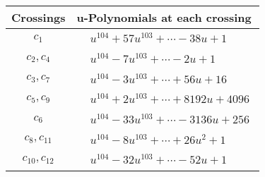 \documentclass[1p]{elsarticle_modified}
\theoremstyle{definition}
\begin{document}
\begin{tabular}{m{50pt}|m{274pt}}
Crossings & \hspace{64pt}u-Polynomials at each crossing \\
\hline $$\begin{aligned}c_{1}\end{aligned}$$&$\begin{aligned}
&u^{104}+57 u^{103}+\cdots-38 u+1
\end{aligned}$\\
\hline $$\begin{aligned}c_{2},c_{4}\end{aligned}$$&$\begin{aligned}
&u^{104}-7 u^{103}+\cdots-2 u+1
\end{aligned}$\\
\hline $$\begin{aligned}c_{3},c_{7}\end{aligned}$$&$\begin{aligned}
&u^{104}-3 u^{103}+\cdots+56 u+16
\end{aligned}$\\
\hline $$\begin{aligned}c_{5},c_{9}\end{aligned}$$&$\begin{aligned}
&u^{104}+2 u^{103}+\cdots+8192 u+4096
\end{aligned}$\\
\hline $$\begin{aligned}c_{6}\end{aligned}$$&$\begin{aligned}
&u^{104}-33 u^{103}+\cdots-3136 u+256
\end{aligned}$\\
\hline $$\begin{aligned}c_{8},c_{11}\end{aligned}$$&$\begin{aligned}
&u^{104}-8 u^{103}+\cdots+26 u^2+1
\end{aligned}$\\
\hline $$\begin{aligned}c_{10},c_{12}\end{aligned}$$&$\begin{aligned}
&u^{104}-32 u^{103}+\cdots-52 u+1
\end{aligned}$\\
\hline
\end{tabular}\\~\\
\newpage\renewcommand{\arraystretch}{1}
\end{document}

